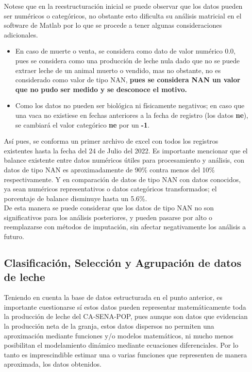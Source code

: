 Notese que en la reestructuración inicial se puede observar que los datos pueden ser numéricos o categóricos, no obstante esto dificulta su análisis matricial en el software de Matlab por lo que se procede a tener algunas consideraciones adicionales.

\begin{itemize}
    \item En caso de muerte o venta, se considera como dato de valor numérico 0.0, pues se considera como una producción de leche nula dado que no se puede extraer leche de un animal muerto o vendido, mas no obstante, no es considerado como valor de tipo NAN, \textbf{pues se considera NAN un valor que no pudo ser medido y se desconoce el motivo.}
    \item Como los datos no pueden ser biológica ni físicamente negativos; en caso que una vaca no existiese en fechas anteriores a la fecha de registro (los datos \textbf{ne}), se cambiará el valor categórico \textbf{ne} por un \textbf{-1}.
\end{itemize}


Así pues, se conforma un primer archivo de excel con todos los registros existentes hasta la fecha del 24 de Julio del 2022. Es importante mencionar que el balance existente entre datos numéricos útiles para procesamiento y análisis, con datos de tipo NAN es  aproximadamente de 90\% contra menos del 10\% respectivamente. Y en comparación de datos de tipo NAN con datos conocidos, ya sean numéricos representativos o datos categóricos transformados; el porcentaje de balance disminuye hasta un 5.6\%.\\

De esta manera se puede considerar que los datos de tipo NAN no son significativos para los análisis posteriores, y pueden pasarse por alto o reemplazarse con métodos de imputación, sin afectar negativamente los análisis a futuro.

\pagebreak

\subsection{Clasificación, Selección y Agrupación de datos de leche}
Teniendo en cuenta la base de datos estructurada en el punto anterior, es importante cuestionarse sí estos datos pueden representar matemáticamente toda la producción de leche del CA-SENA-POP, pues aunque son datos que evidencian la producción neta de la granja, estos datos dispersos no permiten una aproximación mediante funciones y/o modelos matemáticos, ni mucho menos posibilitan el modelamiento dinámico mediante ecuaciones diferenciales. Por lo tanto es imprescindible estimar una o varias funciones que representen de manera aproximada, los datos obtenidos.\\

